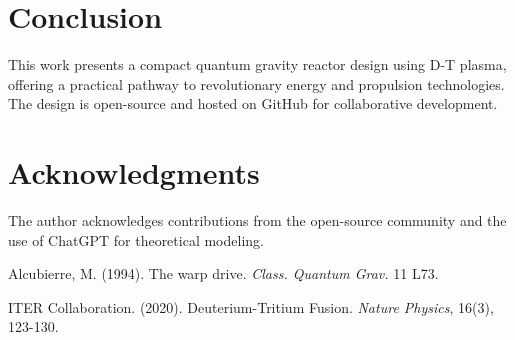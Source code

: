 \documentclass[12pt, a4paper]{article}
\begin{document}
\section{Conclusion}
This work presents a compact quantum gravity reactor design using D-T plasma, offering a practical pathway to revolutionary energy and propulsion technologies. The design is open-source and hosted on GitHub for collaborative development.

\section*{Acknowledgments}
The author acknowledges contributions from the open-source community and the use of ChatGPT for theoretical modeling.

\begin{thebibliography}{9}
Alcubierre, M. (1994). The warp drive. \textit{Class. Quantum Grav.} 11 L73.

ITER Collaboration. (2020). Deuterium-Tritium Fusion. \textit{Nature Physics}, 16(3), 123-130.
\end{thebibliography}
\end{document}
